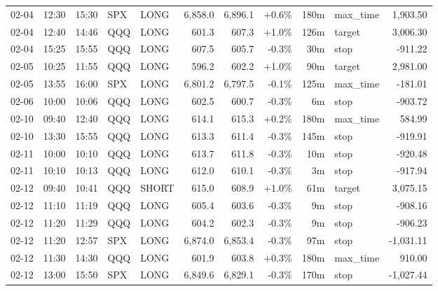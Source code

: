 \documentclass[11pt,a4paper,twoside]{article}
\begin{document}
\begin{center}
\begin{longtable}{>{\color{txtmain}}l l l l l r r r r >{\color{txtmain}}l r}
02-04 & 12:30 & 15:30 & SPX & LONG & 6,858.0 & 6,896.1 & \textcolor{wingreen}{+0.6\%} & 180m & max\_time & \textcolor{wingreen}{1,903.50} \\
02-04 & 12:40 & 14:46 & QQQ & LONG & 601.3 & 607.3 & \textcolor{wingreen}{+1.0\%} & 126m & target & \textcolor{wingreen}{3,006.30} \\
02-04 & 15:25 & 15:55 & QQQ & LONG & 607.5 & 605.7 & \textcolor{lossred}{-0.3\%} & 30m & stop & \textcolor{lossred}{-911.22} \\
02-05 & 10:25 & 11:55 & QQQ & LONG & 596.2 & 602.2 & \textcolor{wingreen}{+1.0\%} & 90m & target & \textcolor{wingreen}{2,981.00} \\
02-05 & 13:55 & 16:00 & SPX & LONG & 6,801.2 & 6,797.5 & \textcolor{lossred}{-0.1\%} & 125m & max\_time & \textcolor{lossred}{-181.01} \\
02-06 & 10:00 & 10:06 & QQQ & LONG & 602.5 & 600.7 & \textcolor{lossred}{-0.3\%} & 6m & stop & \textcolor{lossred}{-903.72} \\
02-10 & 09:40 & 12:40 & QQQ & LONG & 614.1 & 615.3 & \textcolor{wingreen}{+0.2\%} & 180m & max\_time & \textcolor{wingreen}{584.99} \\
02-10 & 13:30 & 15:55 & QQQ & LONG & 613.3 & 611.4 & \textcolor{lossred}{-0.3\%} & 145m & stop & \textcolor{lossred}{-919.91} \\
02-11 & 10:00 & 10:10 & QQQ & LONG & 613.7 & 611.8 & \textcolor{lossred}{-0.3\%} & 10m & stop & \textcolor{lossred}{-920.48} \\
02-11 & 10:10 & 10:13 & QQQ & LONG & 612.0 & 610.1 & \textcolor{lossred}{-0.3\%} & 3m & stop & \textcolor{lossred}{-917.94} \\
02-12 & 09:40 & 10:41 & QQQ & SHORT & 615.0 & 608.9 & \textcolor{wingreen}{+1.0\%} & 61m & target & \textcolor{wingreen}{3,075.15} \\
02-12 & 11:10 & 11:19 & QQQ & LONG & 605.4 & 603.6 & \textcolor{lossred}{-0.3\%} & 9m & stop & \textcolor{lossred}{-908.16} \\
02-12 & 11:20 & 11:29 & QQQ & LONG & 604.2 & 602.3 & \textcolor{lossred}{-0.3\%} & 9m & stop & \textcolor{lossred}{-906.23} \\
02-12 & 11:20 & 12:57 & SPX & LONG & 6,874.0 & 6,853.4 & \textcolor{lossred}{-0.3\%} & 97m & stop & \textcolor{lossred}{-1,031.11} \\
02-12 & 11:30 & 14:30 & QQQ & LONG & 601.9 & 603.8 & \textcolor{wingreen}{+0.3\%} & 180m & max\_time & \textcolor{wingreen}{910.00} \\
02-12 & 13:00 & 15:50 & SPX & LONG & 6,849.6 & 6,829.1 & \textcolor{lossred}{-0.3\%} & 170m & stop & \textcolor{lossred}{-1,027.44} \\

\end{longtable}
\end{center}
\end{document}
